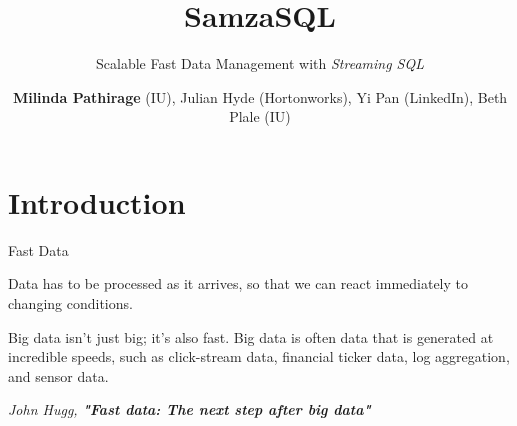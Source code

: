 \documentclass[newPxFont]{beamer}
\title{SamzaSQL}
\subtitle{Scalable Fast Data Management with \textit{Streaming SQL}}
\author{\textbf{Milinda Pathirage} (IU), Julian Hyde (Hortonworks), Yi Pan (LinkedIn), Beth Plale (IU)}
\institute{School of Informatics and Computing, Indiana University}
\begin{document}

%
%

\maketitle


%
%

\section*{Introduction}


\begin{frame}[c]{Fast Data}

Data has to be processed as it arrives, so that we can react immediately to changing conditions. 

\vspace{1em}

\begin{exampleblock}{Big data isn't just big; it's also fast.}
Big data is often data that is generated at incredible speeds, such as click-stream data, financial ticker data, log aggregation, and sensor data. 
\end{exampleblock}
\vspace{-1.5em}
\begin{flushright}
\tiny\textit{John Hugg, \textbf{"Fast data: The next step after big data"}}
\end{flushright}

\end{frame}


\end{document}
